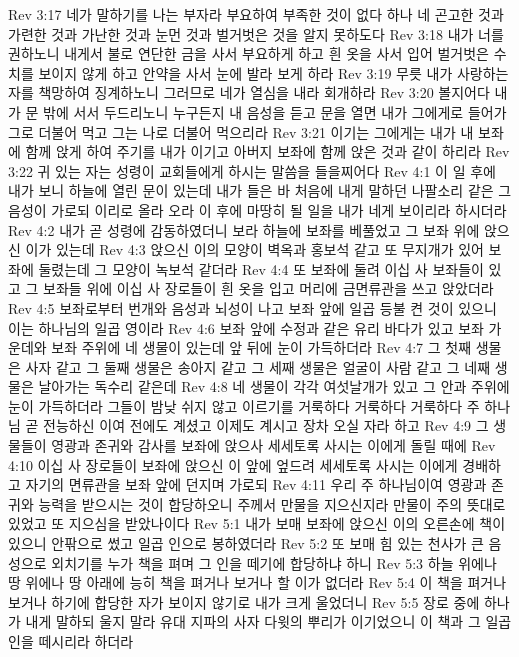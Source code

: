 Rev 3:17  네가 말하기를 나는 부자라 부요하여 부족한 것이 없다 하나 네 곤고한 것과 가련한 것과 가난한 것과 눈먼 것과 벌거벗은 것을 알지 못하도다
Rev 3:18  내가 너를 권하노니 내게서 불로 연단한 금을 사서 부요하게 하고 흰 옷을 사서 입어 벌거벗은 수치를 보이지 않게 하고 안약을 사서 눈에 발라 보게 하라
Rev 3:19  무릇 내가 사랑하는 자를 책망하여 징계하노니 그러므로 네가 열심을 내라 회개하라
Rev 3:20  볼지어다 내가 문 밖에 서서 두드리노니 누구든지 내 음성을 듣고 문을 열면 내가 그에게로 들어가 그로 더불어 먹고 그는 나로 더불어 먹으리라
Rev 3:21  이기는 그에게는 내가 내 보좌에 함께 앉게 하여 주기를 내가 이기고 아버지 보좌에 함께 앉은 것과 같이 하리라
Rev 3:22  귀 있는 자는 성령이 교회들에게 하시는 말씀을 들을찌어다
Rev 4:1  이 일 후에 내가 보니 하늘에 열린 문이 있는데 내가 들은 바 처음에 내게 말하던 나팔소리 같은 그 음성이 가로되 이리로 올라 오라 이 후에 마땅히 될 일을 내가 네게 보이리라 하시더라
Rev 4:2  내가 곧 성령에 감동하였더니 보라 하늘에 보좌를 베풀었고 그 보좌 위에 앉으신 이가 있는데
Rev 4:3  앉으신 이의 모양이 벽옥과 홍보석 같고 또 무지개가 있어 보좌에 둘렸는데 그 모양이 녹보석 같더라
Rev 4:4  또 보좌에 둘려 이십 사 보좌들이 있고 그 보좌들 위에 이십 사 장로들이 흰 옷을 입고 머리에 금면류관을 쓰고 앉았더라
Rev 4:5  보좌로부터 번개와 음성과 뇌성이 나고 보좌 앞에 일곱 등불 켠 것이 있으니 이는 하나님의 일곱 영이라
Rev 4:6  보좌 앞에 수정과 같은 유리 바다가 있고 보좌 가운데와 보좌 주위에 네 생물이 있는데 앞 뒤에 눈이 가득하더라
Rev 4:7  그 첫째 생물은 사자 같고 그 둘째 생물은 송아지 같고 그 세째 생물은 얼굴이 사람 같고 그 네째 생물은 날아가는 독수리 같은데
Rev 4:8  네 생물이 각각 여섯날개가 있고 그 안과 주위에 눈이 가득하더라 그들이 밤낮 쉬지 않고 이르기를 거룩하다 거룩하다 거룩하다 주 하나님 곧 전능하신 이여 전에도 계셨고 이제도 계시고 장차 오실 자라 하고
Rev 4:9  그 생물들이 영광과 존귀와 감사를 보좌에 앉으사 세세토록 사시는 이에게 돌릴 때에
Rev 4:10  이십 사 장로들이 보좌에 앉으신 이 앞에 엎드려 세세토록 사시는 이에게 경배하고 자기의 면류관을 보좌 앞에 던지며 가로되
Rev 4:11  우리 주 하나님이여 영광과 존귀와 능력을 받으시는 것이 합당하오니 주께서 만물을 지으신지라 만물이 주의 뜻대로 있었고 또 지으심을 받았나이다
Rev 5:1  내가 보매 보좌에 앉으신 이의 오른손에 책이 있으니 안팎으로 썼고 일곱 인으로 봉하였더라
Rev 5:2  또 보매 힘 있는 천사가 큰 음성으로 외치기를 누가 책을 펴며 그 인을 떼기에 합당하냐 하니
Rev 5:3  하늘 위에나 땅 위에나 땅 아래에 능히 책을 펴거나 보거나 할 이가 없더라
Rev 5:4  이 책을 펴거나 보거나 하기에 합당한 자가 보이지 않기로 내가 크게 울었더니
Rev 5:5  장로 중에 하나가 내게 말하되 울지 말라 유대 지파의 사자 다윗의 뿌리가 이기었으니 이 책과 그 일곱인을 떼시리라 하더라
